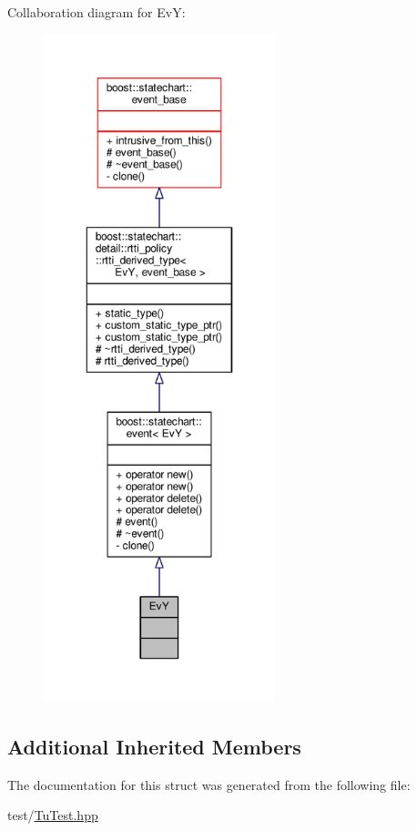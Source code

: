 Collaboration diagram for EvY\+:
\nopagebreak
\begin{figure}[H]
\begin{center}
\leavevmode
\includegraphics[height=550pt]{struct_ev_y__coll__graph}
\end{center}
\end{figure}
\subsection*{Additional Inherited Members}


The documentation for this struct was generated from the following file\+:\begin{DoxyCompactItemize}
\item 
test/\mbox{\hyperlink{_tu_test_8hpp}{Tu\+Test.\+hpp}}\end{DoxyCompactItemize}
